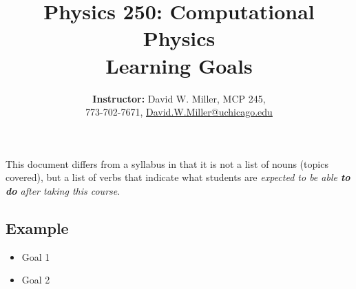 \documentclass[12pt]{article}
\title{\sc Physics 250: Computational Physics\\Learning Goals}
\author{\textbf{Instructor:} David W. Miller, MCP 245, \\ 773-702-7671, \href{mailto:David.W.Miller@uchicago.edu}{David.W.Miller@uchicago.edu}}
\date{}
\begin{document}
\maketitle

\thispagestyle{fancy}


\noindent This document differs from a syllabus in that it is not a list of nouns (topics covered), but a list of verbs that indicate what students are \textit{expected to be able \textbf{to do} after taking this course}.

\subsection*{Example}

\begin{itemize}
  \item Goal 1
  \item Goal 2
\end{itemize}
\end{document}
